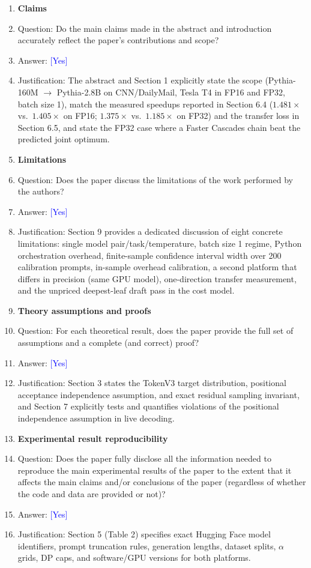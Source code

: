 \documentclass[10pt]{article}
\newcommand{\answerYes}[1][]{\textcolor{blue}{[Yes]} #1}
\newcommand{\answerNo}[1][]{\textcolor{orange}{[No]} #1}
\newcommand{\answerNA}[1][]{\textcolor{gray}{[N/A]} #1}
\begin{document}
\begin{enumerate}

\item {\bf Claims}
    \item[] Question: Do the main claims made in the abstract and introduction accurately reflect the paper's contributions and scope?
    \item[] Answer: \answerYes{} %
    \item[] Justification: The abstract and Section 1 explicitly state the scope (Pythia-160M $\to$ Pythia-2.8B on CNN/DailyMail, Tesla T4 in FP16 and FP32, batch size 1), match the measured speedups reported in Section 6.4 ($1.481\times$ vs.\ $1.405\times$ on FP16; $1.375\times$ vs.\ $1.185\times$ on FP32) and the transfer loss in Section 6.5, and state the FP32 case where a Faster Cascades chain beat the predicted joint optimum.

\item {\bf Limitations}
    \item[] Question: Does the paper discuss the limitations of the work performed by the authors?
    \item[] Answer: \answerYes{}
    \item[] Justification: Section 9 provides a dedicated discussion of eight concrete limitations: single model pair/task/temperature, batch size 1 regime, Python orchestration overhead, finite-sample confidence interval width over 200 calibration prompts, in-sample overhead calibration, a second platform that differs in precision (same GPU model), one-direction transfer measurement, and the unpriced deepest-leaf draft pass in the cost model.

\item {\bf Theory assumptions and proofs}
    \item[] Question: For each theoretical result, does the paper provide the full set of assumptions and a complete (and correct) proof?
    \item[] Answer: \answerYes{}
    \item[] Justification: Section 3 states the TokenV3 target distribution, positional acceptance independence assumption, and exact residual sampling invariant, and Section 7 explicitly tests and quantifies violations of the positional independence assumption in live decoding.

\item {\bf Experimental result reproducibility}
    \item[] Question: Does the paper fully disclose all the information needed to reproduce the main experimental results of the paper to the extent that it affects the main claims and/or conclusions of the paper (regardless of whether the code and data are provided or not)?
    \item[] Answer: \answerYes{}
    \item[] Justification: Section 5 (Table 2) specifies exact Hugging Face model identifiers, prompt truncation rules, generation lengths, dataset splits, $\alpha$ grids, DP caps, and software/GPU versions for both platforms.


\end{enumerate}
\end{document}
